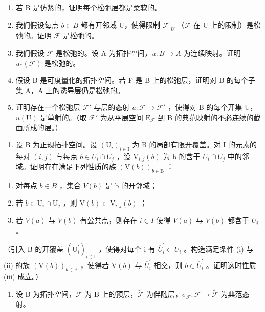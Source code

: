 \begin{enumerate}
\def\labelenumi{\alph{enumi})}
\item
  若 B 是仿紧的，证明每个松弛层都是柔软的。
\item
  我们假设每点 \(b \in B\) 都有开邻域 U，使得限制 \(\mathcal{F}|_{U}\) （\(\mathcal{F}\) 在 U 上的限制）是松弛的。证明 \(\mathcal{F}\) 是松弛的。
\item
  我们假设 \(\mathcal{F}\) 是松弛的。设 A 为拓扑空间，\(u\colon B\to A\) 为连续映射。证明 \(u_{*}(\mathcal{F})\) 是松弛的。
\item
  假设 B 是可度量化的拓扑空间。若 F 是 B 上的松弛层，证明对 B 的每个子集 A，A 上的诱导层仍是松弛的。
\item
  证明存在一个松弛层 \(\mathcal{F}'\) 与层的态射 \(u\colon \mathcal{F}\to \mathcal{F}'\) ，使得对 B 的每个开集 U，\(u(\mathrm{U})\) 是单射的。（取 \(\mathcal{F}'\) 为从平展空间 \(\mathrm{E}_{\mathcal{F}}\) 到 B 的典范映射的不必连续的截面所成的层。）
\end{enumerate}

\begin{enumerate}
\def\labelenumi{\arabic{enumi})}
\setcounter{enumi}{6}
\tightlist
\item
  设 B 为正规拓扑空间。设 \((\mathrm{U}_{i})_{i\in\mathrm{I}}\) 为 B 的局部有限开覆盖。对 I 的元素的每对 \((i,j)\) 与每点 \(b\in U_{i}\cap U_{j}\) ，设 \(\mathrm{V}_{i,j}(b)\) 为 b 的含于 \(U_{i}\cap U_{j}\) 中的邻域。证明存在满足下列性质的族 \((\mathrm{V}(b))_{b\in\mathrm{B}}\) ：
\end{enumerate}

\begin{enumerate}
\def\labelenumi{(\roman{enumi})}
\item
  对每点 \(b \in B\) ，集合 \(V(b)\) 是 b 的开邻域；
\item
  若 \(b \in \mathrm{U}_i \cap \mathrm{U}_j\) ，则 \(\mathrm{V}(b) \subset \mathrm{V}_{i,j}(b)\) ；
\item
  若 \(V(a)\) 与 \(V(b)\) 有公共点，则存在 \(i \in I\) 使得 \(V(a)\) 与 \(V(b)\) 都含于 \(U_i\) 。
\end{enumerate}

（引入 B 的开覆盖 \((\mathrm{U}_{i}^{\prime})_{i\in\mathrm{I}}\) ，使得对每个 i 有 \(\overline{U}_{i}^{\prime}\subset U_{i}\) 。构造满足条件 (i) 与 (ii) 的族 \((\mathrm{V}(b))_{b\in\mathrm{B}}\) ，使得若 \(\mathrm{V}(b)\) 与 \(\overline{U}_{i}^{\prime}\) 相交，则 \(b\in\overline{U}_{i}^{\prime}\) 。证明这时性质 (iii) 成立。）

\begin{enumerate}
\def\labelenumi{\arabic{enumi})}
\setcounter{enumi}{7}
\tightlist
\item
  设 B 为拓扑空间，\(\mathcal{F}\) 为 B 上的预层，\(\widetilde{\mathcal{F}}\) 为伴随层，\(\sigma_{\mathcal{F}}\colon \mathcal{F}\to \widetilde{\mathcal{F}}\) 为典范态射。
\end{enumerate}

